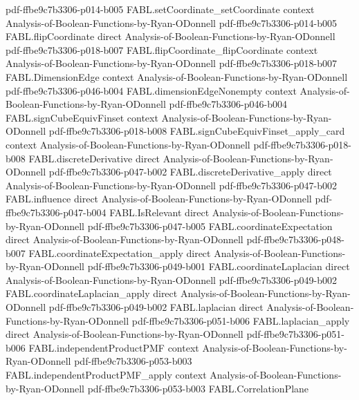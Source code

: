 \begin{theorem}
  {pdf-ffbe9c7b3306-p014-b005}
\proofstep
  {FABL.setCoordinate_setCoordinate}
  {context}
  {Analysis-of-Boolean-Functions-by-Ryan-ODonnell}
  {pdf-ffbe9c7b3306-p014-b005}
\proofstep
  {FABL.flipCoordinate}
  {direct}
  {Analysis-of-Boolean-Functions-by-Ryan-ODonnell}
  {pdf-ffbe9c7b3306-p018-b007}
\proofstep
  {FABL.flipCoordinate_flipCoordinate}
  {context}
  {Analysis-of-Boolean-Functions-by-Ryan-ODonnell}
  {pdf-ffbe9c7b3306-p018-b007}
\proofstep
  {FABL.DimensionEdge}
  {context}
  {Analysis-of-Boolean-Functions-by-Ryan-ODonnell}
  {pdf-ffbe9c7b3306-p046-b004}
\proofstep
  {FABL.dimensionEdgeNonempty}
  {context}
  {Analysis-of-Boolean-Functions-by-Ryan-ODonnell}
  {pdf-ffbe9c7b3306-p046-b004}
\proofstep
  {FABL.signCubeEquivFinset}
  {context}
  {Analysis-of-Boolean-Functions-by-Ryan-ODonnell}
  {pdf-ffbe9c7b3306-p018-b008}
\proofstep
  {FABL.signCubeEquivFinset_apply_card}
  {context}
  {Analysis-of-Boolean-Functions-by-Ryan-ODonnell}
  {pdf-ffbe9c7b3306-p018-b008}
\proofstep
  {FABL.discreteDerivative}
  {direct}
  {Analysis-of-Boolean-Functions-by-Ryan-ODonnell}
  {pdf-ffbe9c7b3306-p047-b002}
\proofstep
  {FABL.discreteDerivative_apply}
  {direct}
  {Analysis-of-Boolean-Functions-by-Ryan-ODonnell}
  {pdf-ffbe9c7b3306-p047-b002}
\proofstep
  {FABL.influence}
  {direct}
  {Analysis-of-Boolean-Functions-by-Ryan-ODonnell}
  {pdf-ffbe9c7b3306-p047-b004}
\proofstep
  {FABL.IsRelevant}
  {direct}
  {Analysis-of-Boolean-Functions-by-Ryan-ODonnell}
  {pdf-ffbe9c7b3306-p047-b005}
\proofstep
  {FABL.coordinateExpectation}
  {direct}
  {Analysis-of-Boolean-Functions-by-Ryan-ODonnell}
  {pdf-ffbe9c7b3306-p048-b007}
\proofstep
  {FABL.coordinateExpectation_apply}
  {direct}
  {Analysis-of-Boolean-Functions-by-Ryan-ODonnell}
  {pdf-ffbe9c7b3306-p049-b001}
\proofstep
  {FABL.coordinateLaplacian}
  {direct}
  {Analysis-of-Boolean-Functions-by-Ryan-ODonnell}
  {pdf-ffbe9c7b3306-p049-b002}
\proofstep
  {FABL.coordinateLaplacian_apply}
  {direct}
  {Analysis-of-Boolean-Functions-by-Ryan-ODonnell}
  {pdf-ffbe9c7b3306-p049-b002}
\proofstep
  {FABL.laplacian}
  {direct}
  {Analysis-of-Boolean-Functions-by-Ryan-ODonnell}
  {pdf-ffbe9c7b3306-p051-b006}
\proofstep
  {FABL.laplacian_apply}
  {direct}
  {Analysis-of-Boolean-Functions-by-Ryan-ODonnell}
  {pdf-ffbe9c7b3306-p051-b006}
\proofstep
  {FABL.independentProductPMF}
  {context}
  {Analysis-of-Boolean-Functions-by-Ryan-ODonnell}
  {pdf-ffbe9c7b3306-p053-b003}
\proofstep
  {FABL.independentProductPMF_apply}
  {context}
  {Analysis-of-Boolean-Functions-by-Ryan-ODonnell}
  {pdf-ffbe9c7b3306-p053-b003}
\proofstep
  {FABL.CorrelationPlane}

\end{theorem}
